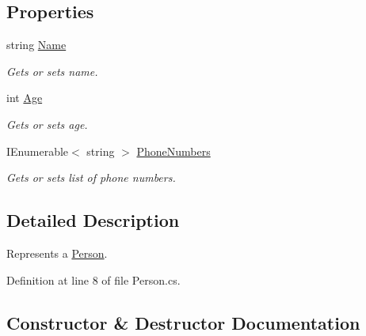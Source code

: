 \subsection*{Properties}
\begin{DoxyCompactItemize}
\item 
string \mbox{\hyperlink{class_test_project_1_1_task_library_1_1_tasks_1_1_lesson7_1_1_models_1_1_person_a34850f28fb4b38896ace9fc9dc8e4351}{Name}}
\begin{DoxyCompactList}\small\item\em Gets or sets name. \end{DoxyCompactList}\item 
int \mbox{\hyperlink{class_test_project_1_1_task_library_1_1_tasks_1_1_lesson7_1_1_models_1_1_person_a079ad0d035f40df1187595fecd5ab8bd}{Age}}
\begin{DoxyCompactList}\small\item\em Gets or sets age. \end{DoxyCompactList}\item 
I\+Enumerable$<$ string $>$ \mbox{\hyperlink{class_test_project_1_1_task_library_1_1_tasks_1_1_lesson7_1_1_models_1_1_person_a582085bdb7689baadf6883c9e8148307}{Phone\+Numbers}}
\begin{DoxyCompactList}\small\item\em Gets or sets list of phone numbers. \end{DoxyCompactList}\end{DoxyCompactItemize}


\subsection{Detailed Description}
Represents a \mbox{\hyperlink{class_test_project_1_1_task_library_1_1_tasks_1_1_lesson7_1_1_models_1_1_person}{Person}}. 



Definition at line 8 of file Person.\+cs.



\subsection{Constructor \& Destructor Documentation}
\mbox{\label{class_test_project_1_1_task_library_1_1_tasks_1_1_lesson7_1_1_models_1_1_person_a958083175a01303465c08267fe845bec}} 
